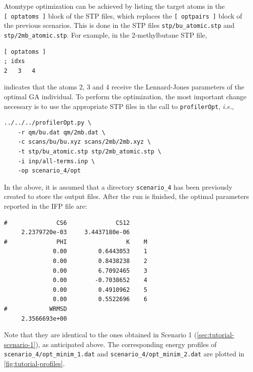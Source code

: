 \documentclass[10pt,a4paper,openany]{memoir}
\numberwithin{equation}{section}
\newcommand{\under}{\_}
\newcommand{\profileropt}[0]{\texttt{profilerOpt}}
\begin{document}
Atomtype optimization can be achieved by listing the target atoms in
the \texttt{[~optatoms~]} block of the STP files, which replaces the
\texttt{[~optpairs~]} block of the previous scenarios.
%
This is done in the STP files \texttt{stp/bu\under{}atomic.stp} and
\texttt{stp/2mb\under{}atomic.stp}.
%
For example, in the 2-methylbutane STP file,

\begin{lstlisting}[language=gromacs]
[ optatoms ]
; idxs
2   3   4
\end{lstlisting}\vspace{1ex}\par

\noindent indicates that the atoms 2, 3 and 4 receive the
Lennard-Jones parameters of the optimal GA individual.
%
To perform the optimization, the most important change necessary is to
use the appropriate STP files in the call to \profileropt,
\textit{i.e.},

\begin{lstlisting}
../../../profilerOpt.py \
    -r qm/bu.dat qm/2mb.dat \
    -c scans/bu/bu.xyz scans/2mb/2mb.xyz \
    -t stp/bu_atomic.stp stp/2mb_atomic.stp \
    -i inp/all-terms.inp \
    -op scenario_4/opt
\end{lstlisting}\vspace{1ex}\par

\noindent In the above, it is assumed that a directory
\texttt{scenario\under{}4} has been previously created to store the
output files.
%
After the run is finished, the optimal parameters reported in the IFP
file are:

\begin{lstlisting}
#              CS6              CS12
     2.2379720e-03     3.4437180e-06
#              PHI                 K    M
              0.00         0.6443053    1
              0.00         0.8438238    2
              0.00         6.7092465    3
              0.00        -0.7038652    4
              0.00         0.4910962    5
              0.00         0.5522696    6
#            WRMSD
     2.3566693e+00
\end{lstlisting}\vspace{1ex}\par

\noindent Note that they are identical to the ones obtained in
Scenario 1 (\autoref{sec:tutorial-scenario-1}), as anticipated above.
%
The corresponding energy profiles of
\texttt{scenario\under{}4/opt\under{}minim\under{}1.dat} and
\texttt{scenario\under{}4/opt\under{}minim\under{}2.dat} are plotted
in \autoref{fig:tutorial-profiles}.
\end{document}
